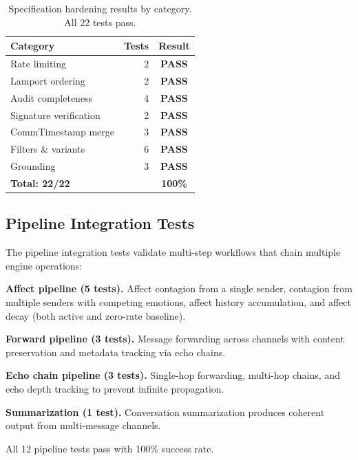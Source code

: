 \documentclass[10pt, twocolumn]{article}
\begin{document}
\begin{table}[t]
\caption{Specification hardening results by category. All 22 tests pass.}
\label{tab:hardening}
\centering
\small
\begin{tabular}{@{}lrc@{}}
\toprule
\textbf{Category} & \textbf{Tests} & \textbf{Result} \\
\midrule
Rate limiting & 2 & \textcolor{amgreen}{\textbf{PASS}} \\
Lamport ordering & 2 & \textcolor{amgreen}{\textbf{PASS}} \\
Audit completeness & 4 & \textcolor{amgreen}{\textbf{PASS}} \\
Signature verification & 2 & \textcolor{amgreen}{\textbf{PASS}} \\
CommTimestamp merge & 3 & \textcolor{amgreen}{\textbf{PASS}} \\
Filters \& variants & 6 & \textcolor{amgreen}{\textbf{PASS}} \\
Grounding & 3 & \textcolor{amgreen}{\textbf{PASS}} \\
\midrule
\textbf{Total: 22/22} & & \textbf{100\%} \\
\bottomrule
\end{tabular}
\end{table}


\subsection{Pipeline Integration Tests}

The pipeline integration tests validate multi-step workflows that chain multiple engine operations:

\textbf{Affect pipeline (5 tests).} Affect contagion from a single sender, contagion from multiple senders with competing emotions, affect history accumulation, and affect decay (both active and zero-rate baseline).

\textbf{Forward pipeline (3 tests).} Message forwarding across channels with content preservation and metadata tracking via echo chains.

\textbf{Echo chain pipeline (3 tests).} Single-hop forwarding, multi-hop chains, and echo depth tracking to prevent infinite propagation.

\textbf{Summarization (1 test).} Conversation summarization produces coherent output from multi-message channels.

All 12 pipeline tests pass with 100\% success rate.
\end{document}
